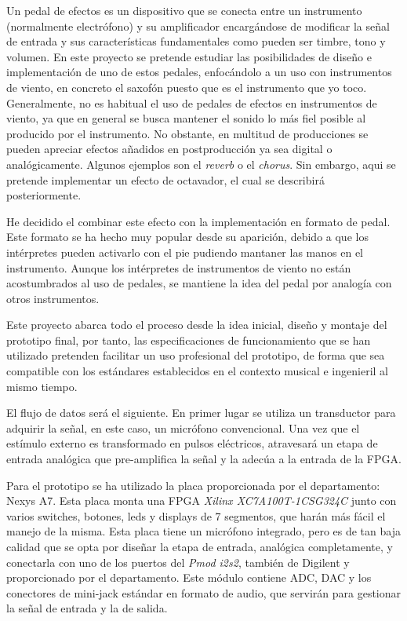 Un pedal de efectos es un dispositivo que se conecta entre un instrumento (normalmente electrófono) y su amplificador encargándose de modificar la señal de entrada y sus características fundamentales como pueden ser timbre, tono y volumen. En este proyecto se pretende estudiar las posibilidades de diseño e implementación de uno de estos pedales, enfocándolo a un uso con instrumentos de viento, en concreto el saxofón puesto que es el instrumento que yo toco. Generalmente, no es habitual el uso de pedales de efectos en instrumentos de viento, ya que en general se busca mantener el sonido lo más fiel posible al producido por el instrumento. No obstante, en multitud de producciones se pueden apreciar efectos añadidos en postproducción ya sea digital o analógicamente. Algunos ejemplos son el \emph{reverb} o el \emph{chorus}. Sin embargo, aqui se pretende implementar un efecto de octavador, el cual se describirá posteriormente.

He decidido el combinar este efecto con la implementación en formato de pedal. Este formato se ha hecho muy popular desde su aparición, debido a que los intérpretes pueden activarlo con el pie pudiendo mantaner las manos en el instrumento. Aunque los intérpretes de instrumentos de viento no están acostumbrados al uso de pedales, se mantiene la idea del pedal por analogía con otros instrumentos.

Este proyecto abarca todo el proceso desde la idea inicial, diseño y montaje del prototipo final, por tanto, las especificaciones de funcionamiento que se han utilizado pretenden facilitar un uso profesional del prototipo, de forma que sea compatible con los estándares establecidos en el contexto musical e ingenieril al mismo tiempo.

El flujo de datos será el siguiente. En primer lugar se utiliza un transductor para adquirir la señal, en este caso, un micrófono convencional. Una vez que el estímulo externo es transformado en pulsos eléctricos, atravesará un etapa de entrada analógica que pre-amplifica la señal y la adecúa a la entrada de la FPGA.

Para el prototipo se ha utilizado la placa proporcionada por el departamento: Nexys A7. Esta placa monta una FPGA \emph{Xilinx XC7A100T-1CSG324C} junto con varios switches, botones, leds y displays de 7 segmentos, que harán más fácil el manejo de la misma. Esta placa tiene un micrófono integrado, pero es de tan baja calidad que se opta por diseñar la etapa de entrada, analógica completamente, y conectarla con uno de los puertos del \emph{Pmod i2s2}, también de Digilent y proporcionado por el departamento. Este módulo contiene ADC, DAC y los conectores de mini-jack estándar en formato de audio, que servirán para gestionar la señal de entrada y la de salida.

